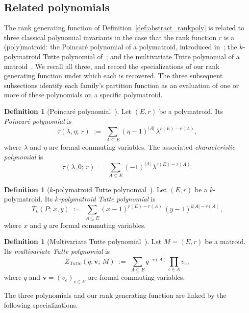\documentclass[11pt,reqno]{amsart}
\newcommand{\vecv}{\boldsymbol{v}}
\theoremstyle{plain}
\theoremstyle{definition}
\newtheorem{definition}[theorem]{Definition}
\numberwithin{equation}{section}
\begin{document}
\subsection{Related polynomials}
\label{sec:poincare}

The rank generating function of Definition~\ref{def:abstract_rankpoly} is related to three classical polynomial invariants in the case that the rank function $r$ is a (poly)matroid: the Poincar\'e polynomial of a polymatroid, introduced in~\cite{Helg}; the $k$-polymatroid Tutte polynomial of~\cite{Berrekkal2026}; and the multivariate Tutte polynomial of a matroid~\cite{Sok05, ellis-monaghanHandbookTuttePolynomial2022}. We recall all three, and record the specializations of our rank generating function under which each is recovered. The three subsequent subsections identify each family's partition function as an evaluation of one or more of these polynomials on a specific polymatroid.

\begin{definition}[Poincar\'e polynomial~\cite{Helg}]
\label{def:Helgason_poincare}
Let $(E, r)$ be a polymatroid. Its \emph{Poincar\'e polynomial} is
\[
    \tau(\lambda, \eta;\, r)
    \;:=\;
    \sum_{A \subseteq E} (\eta - 1)^{|A|}\, \lambda^{r(E) - r(A)},
\]
where $\lambda$ and $\eta$ are formal commuting variables. The
associated \emph{characteristic polynomial} is
\[
    \tau(\lambda, 0;\, r)
    \;=\; \sum_{A \subseteq E} (-1)^{|A|}\, \lambda^{r(E) - r(A)}.
\]
\end{definition}

\begin{definition}[$k$-polymatroid Tutte polynomial~\cite{Berrekkal2026}]
\label{def:bem_Tk}
Let $(E, r)$ be a $k$-polymatroid. Its \emph{$k$-polymatroid Tutte
polynomial} is
\[
    T_k(P;\, x, y)
    \;:=\;
    \sum_{A \subseteq E} (x - 1)^{r(E) - r(A)}\, (y - 1)^{k|A| - r(A)},
\]
where $x$ and $y$ are formal commuting variables.
\end{definition}

\begin{definition}[Multivariate Tutte polynomial~\cite{Sok05}]
\label{def:multi_tutte}
Let $M = (E, r)$ be a matroid. Its \emph{multivariate Tutte
polynomial} is
\[
    \widetilde Z_{\mathrm{Tutte}}(q, \vecv;\, M)
    \;:=\;
    \sum_{A \subseteq E} q^{-r(A)} \prod_{e \in A} v_e,
\]
where $q$ and $\vecv = (v_e)_{e \in E}$ are formal commuting
variables.
\end{definition}

The three polynomials and our rank generating function are linked by the
following specializations.
\end{document}

